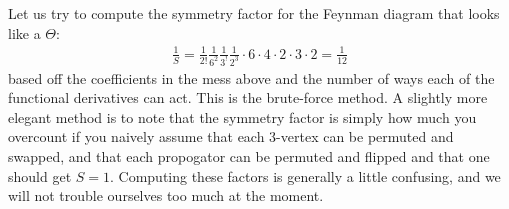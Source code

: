 \documentclass{../mathnotes}
\begin{document}
Let us try to compute the symmetry factor for the Feynman diagram that looks like a $\Theta$:
\begin{align*}
    \frac{1}{S}=\frac{1}{2!}\frac{1}{6^2}\frac{1}{3^!}\frac{1}{2^3}\cdot 6\cdot 4\cdot 2\cdot 3\cdot 2=\frac{1}{12}
\end{align*}
based off the coefficients in the mess above and the number of ways each of the functional  derivatives can act. This is the brute-force method.
A slightly more elegant method is to note that the symmetry factor is simply how much you overcount if you naively assume that each 3-vertex can
be permuted and swapped, and that each propogator can be permuted and flipped and that one should get $S=1$. Computing these factors is generally
a little confusing, and we will not trouble ourselves too much at the moment.
\end{document}
